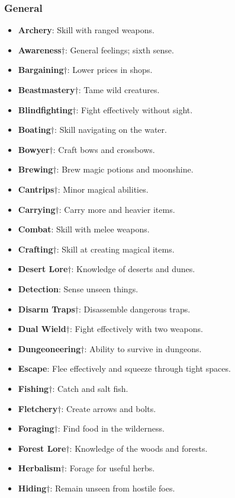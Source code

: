 \documentclass{article}
\begin{document}
\subsubsection{General}
\begin{itemize}
\item {\bf Archery}: Skill with ranged weapons.
\item {\bf Awareness}$\dagger$: General feelings; sixth sense.
\item {\bf Bargaining}$\dagger$: Lower prices in shops.
\item {\bf Beastmastery}$\dagger$: Tame wild creatures.
\item {\bf Blindfighting}$\dagger$: Fight effectively without sight. 
\item {\bf Boating}$\dagger$: Skill navigating on the water.
\item {\bf Bowyer}$\dagger$: Craft bows and crossbows.
\item {\bf Brewing}$\dagger$: Brew magic potions and moonshine. 
\item {\bf Cantrips}$\dagger$: Minor magical abilities. 
\item {\bf Carrying}$\dagger$: Carry more and heavier items.
\item {\bf Combat}: Skill with melee weapons. 
\item {\bf Crafting}$\dagger$: Skill at creating magical items. 
\item {\bf Desert Lore}$\dagger$: Knowledge of deserts and dunes. 
\item {\bf Detection}: Sense unseen things.
\item {\bf Disarm Traps}$\dagger$: Disassemble dangerous traps. 
\item {\bf Dual Wield}$\dagger$: Fight effectively with two weapons. 
\item {\bf Dungeoneering}$\dagger$: Ability to survive in dungeons.
\item {\bf Escape}: Flee effectively and squeeze through tight spaces.
\item {\bf Fishing}$\dagger$: Catch and salt fish.
\item {\bf Fletchery}$\dagger$: Create arrows and bolts. 
\item {\bf Foraging}$\dagger$: Find food in the wilderness.
\item {\bf Forest Lore}$\dagger$: Knowledge of the woods and forests. 
\item {\bf Herbalism}$\dagger$: Forage for useful herbs. 
\item {\bf Hiding}$\dagger$: Remain unseen from hostile foes.

\end{itemize}
\end{document}
